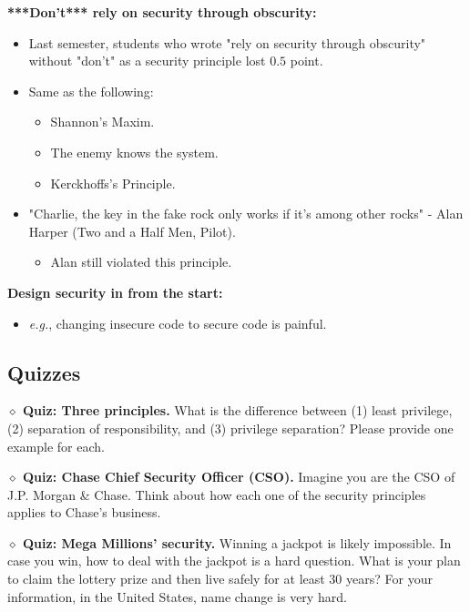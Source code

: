\documentclass{article}
\newcommand{\parhead}[1]{\noindent \textbf{#1}}
\begin{document}
\smallskip\parhead{***Don’t*** rely on security through obscurity:}
\begin{itemize}
    \item Last semester, students who wrote "rely on security through obscurity" without "don't" as a security principle lost $0.5$ point.
    
    \item Same as the following:
    \begin{itemize}
        \item Shannon's Maxim.
        \item The enemy knows the system.
        \item Kerckhoffs's Principle.
    \end{itemize}
    
    \item "Charlie, the key in the fake rock only works if it's among other rocks" - Alan Harper (Two and a Half Men, Pilot).
    \begin{itemize}
        \item Alan still violated this principle.
    \end{itemize}
\end{itemize}

\smallskip\parhead{Design security in from the start:}
\begin{itemize}
    \item \emph{e.g.}, changing insecure code to secure code is painful.
\end{itemize}

\newpage
\subsection{Quizzes}

\parhead{$\diamond$ Quiz: Three principles.}
What is the difference between (1) least privilege, (2) separation of responsibility, and (3) privilege separation? Please provide one example for each. 
\vspace{10em}

\parhead{$\diamond$ Quiz: Chase Chief Security Officer (CSO).}
Imagine you are the CSO of J.P. Morgan \& Chase. Think about how each one of the security principles applies to Chase's business. 
\vspace{15em}

\parhead{$\diamond$ Quiz: Mega Millions' security.}
Winning a jackpot is likely impossible. In case you win, how to deal with the jackpot is a hard question. What is your plan to claim the lottery prize and then live safely for at least 30 years? For your information, in the United States, name change is very hard.
\vspace{5em}
\end{document}
